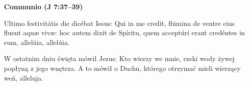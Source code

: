\documentclass[10pt,a5paper]{book}
\newcommand{\oremus}[3]{\medskip\centerline{\textbf{#1}}\medskip
	\begin{sloppypar}
		\begin{paracol}{2}
			\setlength{\columnsep}{0em}
			\begin{leftcolumn}
				#2
			\end{leftcolumn}
			\begin{rightcolumn}
				#3
			\end{rightcolumn}
		\end{paracol}
	\end{sloppypar}}
\begin{document}
					\oremus{Communio (J 7:37--39)}{
						Ultimo festivitátis die dicébat Iesus: Qui in me credit, flúmina de ventre eius fluent aquæ vivæ: hoc autem dixit de Spíritu, quem acceptúri erant credéntes in eum, allelúia, allelúia.}{
						W ostatnim dniu święta mówił Jezus: Kto wierzy we mnie, rzeki wody żywej popłyną z jego wnętrza. A to mówił o Duchu, którego otrzymać mieli wierzący weń, alleluja.}
					
					\vfill
					
					\centerline{}
					
					\vfill
					
					\newpage
					

					\vspace*{-2em}
					
\end{document}
